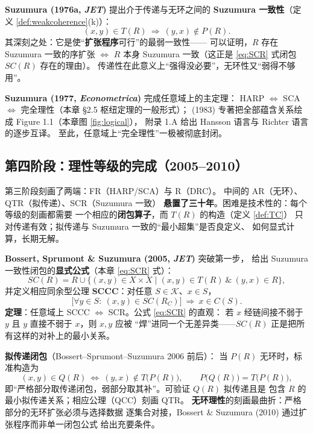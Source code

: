 \textbf{Suzumura (1976a, \emph{JET})} 提出介于传递与无环之间的
\textbf{Suzumura 一致性}（定义 \ref{def:weakcoherence}(k)）：
\begin{equation}
(x,y)\in T(R)\ \Rightarrow\ (y,x)\notin P(R).
\end{equation}
其深刻之处：它是使“\textbf{扩张程序}可行”的最弱一致性——
可以证明，$R$ 存在 Suzumura 一致的序扩张 $\iff$ $R$ 本身
Suzumura 一致（这正是 \eqref{eq:SCR} 式闭包 $SC(R)$ 存在的理由）。
传递性在此意义上“强得没必要”，无环性又“弱得不够用”。

\textbf{Suzumura (1977, \emph{Econometrica})} 完成任意域上的主定理：
HARP $\iff$ SCA $\iff$ 完全理性（本章 §2.5 枢纽定理的一般形式）；
(1983) 专著把全部蕴含关系绘成 Figure 1.1（本章图 \ref{fig:logical}），
附录 1.A 给出 Hansson 语言与 Richter 语言的逐步互译。
至此，任意域上“完全理性”一极被彻底封闭。

\subsection{第四阶段：理性等级的完成（2005--2010）}

第三阶段刻画了两端：FR（HARP/SCA）与 R（DRC）。
中间的 AR（无环）、QTR（拟传递）、SCR（Suzumura 一致）
\textbf{悬置了三十年}。困难是技术性的：每个等级的刻画都需要
一个相应的\textbf{闭包算子}，而 $T(R)$ 的构造（定义 \ref{def:TC}）
只对传递有效；拟传递与 Suzumura 一致的“最小超集”是否良定义、
如何显式计算，长期无解。

\textbf{Bossert, Sprumont \& Suzumura (2005, \emph{JET})} 突破第一步，
给出 Suzumura 一致性闭包的\textbf{显式公式}（本章 \eqref{eq:SCR} 式）：
\begin{equation}
SC(R)=R\cup\{(x,y)\in X\times X\mid (x,y)\in T(R)\ \&\ (y,x)\in R\},
\end{equation}
并定义相应同余型公理 \textbf{SCCC}：对任意 $S\in\mathcal{K}$、$x\in S$，
\begin{equation}
\bigl[\forall y\in S:\ (x,y)\in SC(R_C)\bigr]\ \Rightarrow\ x\in C(S).
\end{equation}
\textbf{定理}：任意域上 SCCC $\iff$ SCR。公式 \eqref{eq:SCR} 的直观：
若 $x$ 经链间接不弱于 $y$ 且 $y$ 直接不弱于 $x$，则 $x,y$ 应被
“焊”进同一个无差异类——$SC(R)$ 正是把所有这样的对补上的最小关系。

\textbf{拟传递闭包}（Bossert--Sprumont--Suzumura 2006 前后）：
当 $P(R)$ 无环时，标准构造为
\begin{equation}
(x,y)\in Q(R)\ \Longleftrightarrow\ (y,x)\notin T\bigl(P(R)\bigr),
\qquad P\bigl(Q(R)\bigr)=T\bigl(P(R)\bigr),
\end{equation}
即“严格部分取传递闭包，弱部分取其补”。可验证 $Q(R)$ 拟传递且是
包含 $R$ 的最小拟传递关系；相应公理（QCC）刻画 QTR。
\textbf{无环理性}的刻画最曲折：严格部分的无环扩张必须与选择数据
逐集合对接，Bossert \& Suzumura (2010) 通过扩张程序而非单一闭包公式
给出充要条件。

